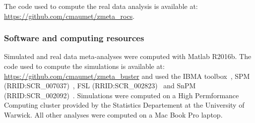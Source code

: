 \documentclass[preprint]{elsarticle}
\newcommand{\vareffect}[1][i]{s^2_{#1}}
\newcommand{\nStudies}{k}
\newcommand{\estvarBetween}{\hat\tau^2}
\begin{document}
The code used to compute the real data analysis is available at: \url{https://github.com/cmaumet/zmeta_rocs}.





\subsubsection{Software and computing resources}

Simulated and real data meta-analyses were computed with Matlab R2016b. The code used to compute the simulations is available at: \url{https://github.com/cmaumet/zmeta_buster} and used the IBMA toolbox~\cite{Maumet2014}, SPM (RRID:SCR\_007037)~\cite{Friston2007}, FSL (RRID:SCR\_002823)~\cite{Jenkinson2012} and SnPM (RRID:SCR\_002092)~\cite{Nichols2002}. Simulations were computed on a High Permformance Computing cluster provided by the Statistics Departement at the University of Warwick. All other analyses were computed on a Mac Book Pro laptop.
\end{document}
